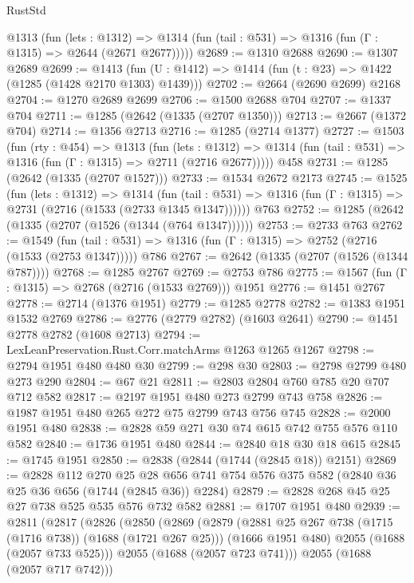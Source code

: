\begin{lexlean}{RustStd}
\begin{coremodule}
    @1313
      (fun (lets : @1312) =>
      @1314 (fun (tail : @531) => @1316 (fun (Γ : @1315) => @2644 (@2671 @2677)))))
@2689 := @1310 @2688
@2690 := @1307 @2689
@2699 := @1413 (fun (U : @1412) => @1414 (fun (t : @23) => @1422 (@1285 (@1428 @2170 @1303) @1439)))
@2702 := @2664 (@2690 @2699) @2168
@2704 := @1270 @2689 @2699
@2706 := @1500 @2688 @704
@2707 := @1337 @704
@2711 := @1285 (@2642 (@1335 (@2707 @1350)))
@2713 := @2667 (@1372 @704)
@2714 := @1356 @2713
@2716 := @1285 (@2714 @1377)
@2727 := @1503
    (fun (rty : @454) =>
    @1313
      (fun (lets : @1312) =>
      @1314 (fun (tail : @531) => @1316 (fun (Γ : @1315) => @2711 (@2716 @2677)))))
    @458
@2731 := @1285 (@2642 (@1335 (@2707 @1527)))
@2733 := @1534 @2672 @2173
@2745 := @1525
    (fun (lets : @1312) =>
    @1314
      (fun (tail : @531) => @1316 (fun (Γ : @1315) => @2731 (@2716 (@1533 (@2733 @1345 @1347))))))
    @763
@2752 := @1285 (@2642 (@1335 (@2707 (@1526 (@1344 (@764 @1347))))))
@2753 := @2733 @763
@2762 := @1549
    (fun (tail : @531) => @1316 (fun (Γ : @1315) => @2752 (@2716 (@1533 (@2753 @1347)))))
    @786
@2767 := @2642 (@1335 (@2707 (@1526 (@1344 @787))))
@2768 := @1285 @2767
@2769 := @2753 @786
@2775 := @1567 (fun (Γ : @1315) => @2768 (@2716 (@1533 @2769))) @1951
@2776 := @1451 @2767
@2778 := @2714 (@1376 @1951)
@2779 := @1285 @2778
@2782 := @1383 @1951 @1532 @2769
@2786 := @2776 (@2779 @2782) (@1603 @2641)
@2790 := @1451 @2778 @2782 (@1608 @2713)
@2794 := LexLeanPreservation.Rust.Corr.matchArms @1263 @1265 @1267
@2798 := @2794 @1951 @480 @480 @30
@2799 := @298 @30
@2803 := @2798 @2799 @480 @273 @290
@2804 := @67 @21
@2811 := @2803 @2804 @760 @785 @20 @707 @712 @582
@2817 := @2197 @1951 @480 @273 @2799 @743 @758
@2826 := @1987 @1951 @480 @265 @272 @75 @2799 @743 @756 @745
@2828 := @2000 @1951 @480
@2838 := @2828 @59 @271 @30 @74 @615 @742 @755 @576 @110 @582
@2840 := @1736 @1951 @480
@2844 := @2840 @18 @30 @18 @615
@2845 := @1745 @1951
@2850 := @2838 (@2844 (@1744 (@2845 @18)) @2151)
@2869 := @2828
    @112
    @270
    @25
    @28
    @656
    @741
    @754
    @576
    @375
    @582
    (@2840 @36 @25 @36 @656 (@1744 (@2845 @36)) @2284)
@2879 := @2828 @268 @45 @25 @27 @738 @525 @535 @576 @732 @582
@2881 := @1707 @1951 @480
@2939 := @2811
    (@2817
      (@2826
        (@2850
          (@2869
            (@2879
              (@2881 @25 @267 @738 (@1715 (@1716 @738)) (@1688 (@1721 @267 @25)))
              (@1666 @1951 @480)
              @2055
              (@1688 (@2057 @733 @525)))
            @2055
            (@1688 (@2057 @723 @741)))
          @2055
          (@1688 (@2057 @717 @742)))

\end{coremodule}
\end{lexlean}
